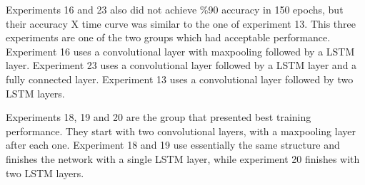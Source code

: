 
Experiments 16 and 23 also did not achieve \%90 accuracy in 150 epochs, but their accuracy X time curve was similar to the one of experiment 13. This three experiments are one of the two groups which had acceptable performance.
Experiment 16 uses a convolutional layer with maxpooling followed by a LSTM layer. Experiment 23 uses a convolutional layer followed by a LSTM layer and a fully connected layer.
Experiment 13 uses a convolutional layer followed by two LSTM layers.


Experiments 18, 19 and 20 are the group that presented best training performance. They start with two convolutional layers, with a maxpooling layer after each one. Experiment 18 and 19 use essentially the same structure and finishes the network with a single LSTM layer, while experiment 20 finishes with two LSTM layers.


